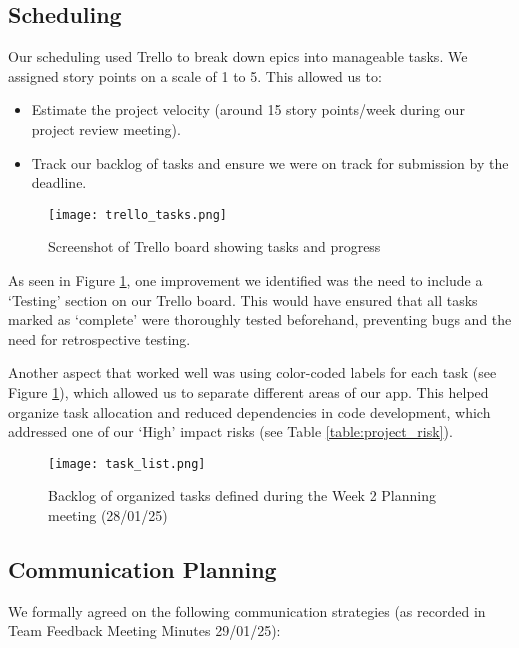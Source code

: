 \subsection{Scheduling}
Our scheduling used Trello to break down epics into manageable tasks. We assigned story points on a scale of 1 to 5. This allowed us to:
\begin{itemize}
    \item Estimate the project velocity (around 15 story points/week during our project review meeting).
    \item Track our backlog of tasks and ensure we were on track for submission by the deadline.
\end{itemize}

\begin{figure}[H]
    \centering
    \texttt{[image: trello\_tasks.png]} %
    \caption{Screenshot of Trello board showing tasks and progress}
    \label{fig:trello_tasks}
\end{figure}

As seen in Figure \ref{fig:trello_tasks}, one improvement we identified was the need to include a ‘Testing’ section on our Trello board. This would have ensured that all tasks marked as ‘complete’ were thoroughly tested beforehand, preventing bugs and the need for retrospective testing.

Another aspect that worked well was using color-coded labels for each task (see Figure \ref{fig:trello_tasks}), which allowed us to separate different areas of our app. This helped organize task allocation and reduced dependencies in code development, which addressed one of our ‘High’ impact risks (see Table \ref{table:project_risk}).

\begin{figure}[H]
    \centering
    \texttt{[image: task\_list.png]} %
    \caption{Backlog of organized tasks defined during the Week 2 Planning meeting (28/01/25)}
    \label{fig:task_list}
\end{figure}

\subsection{Communication Planning}
We formally agreed on the following communication strategies (as recorded in Team Feedback Meeting Minutes 29/01/25):

